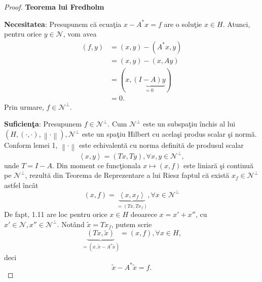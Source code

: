 \documentclass[a4paper,12pt,oneside]{report}
\begin{document}
\begin{proof} \textbf{Teorema lui Fredholm}

\noindent \textbf{Necesitatea}:  Presupunem c\u{a} ecua\c{t}ia \(x-A^{\ast }x = f\) are o solu\c{t}ie \(x\in H.\) Atunci, pentru orice \(y\in { \mathcal{N}}\), vom avea
\begin{equation}\nonumber
    \begin{split}
      \left ( f,y \right ) &    = \left ( x,y \right ) - \left ( A^{\ast }x,y \right ) \\ &  = \left ( x,y \right ) - \left ( x,Ay \right ) \\ &  = \left ( x, \underbrace{ \left ( I-A \right )y}_{=0} \right )  \\ & = 0.
    \end{split}
\end{equation}
Prin urmare, \(f \in {\mathcal{N}} ^{\perp }. \)

\noindent \textbf{Suficien\c{t}a}: Presupunem \(f \in {\mathcal{N}} ^{\perp }.\) Cum \({\mathcal{N}} ^{\perp }\) este un subspa\c{t}iu \^{i}nchis al lui \( \left ( H, \left ( \cdot ,\cdot  \right ), \left \| \cdot  \right \| \right ), {\mathcal{N}} ^{\perp }\) este un spa\c{t}iu Hilbert cu acela\c{s}i produs scalar \c{s}i norm\u{a}. Conform lemei 1, \(\left \| \cdot  \right \|\) este echivalent\u{a} cu norma definit\u{a} de produsul scalar
\begin{displaymath}
  \left \langle x,y \right \rangle = \left ( Tx,Ty \right ), \forall x,y \in {\mathcal{N}} ^{\perp },
\end{displaymath}
unde \(T=I-A\). Din moment ce func\c{t}ionala \(x \mapsto \left ( x,f \right )\) este liniar\u{a} \c{s}i continu\u{a} pe \({\mathcal{N}} ^{\perp }\), rezult\u{a} din Teorema de Reprezentare a lui Riesz faptul c\u{a} exist\u{a} \(x_{f }\in{\mathcal{N}} ^{\perp }\) astfel \^{i}nc\^{a}t
\begin{displaymath}
  \left ( x,f \right ) = \underbrace{\left \langle x,x_{f} \right \rangle}_{= \left ( Tx,Tx_{f} \right )}, \forall x \in {\mathcal{N}} ^{\perp } \label{eq1.11} \tag{1.11}
\end{displaymath}
De fapt, 1.11 are loc pentru orice \(x \in H\) deoarece \(x = {x}' + {x}''\), cu \({x}' \in {\mathcal{N}}, {x}'' \in {\mathcal{N}}^{\perp }\). Not\^{a}nd \(\tilde{x} = Tx_{f}\), putem scrie
\begin{displaymath}
  \underbrace{\left ( Tx,\tilde{x} \right )}_{=\left ( x,\tilde{x} -A^{\ast }\tilde{x}\right )} = \left ( x,f \right ), \forall x \in H,
\end{displaymath}
deci
\begin{displaymath}
  \tilde{x} - A^{\ast }\tilde{x} = f.
\end{displaymath}
\end{proof}
\end{document}

